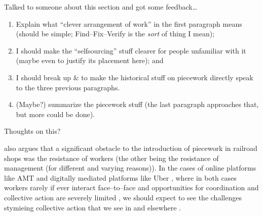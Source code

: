 \documentclass[trackingWork]{subfiles}
\begin{document}
{      Talked to someone about this section and got some feedback\dots
      \begin{enumerate}
        \item Explain what ``clever arrangement of work'' in the first paragraph means
              (should be simple; Find--Fix--Verify is the \textit{sort} of thing I mean);
        \item I should make the ``selfsourcing'' stuff clearer for people unfamiliar with it
              (maybe even to justify its placement here); and
        \item I should break up \citeauthor{10.2307/23702539} \& \citeauthor{Brown01041990}
              to make the historical stuff on piecework
              directly speak to the three previous paragraphs.
        \item (Maybe?) summarize the piecework stuff
              (the last paragraph approaches that, but more could be done).
      \end{enumerate}
      Thoughts on this?

  \citeauthor{10.2307/23702539} also argues that
  a significant obstacle to the introduction of piecework in railroad shops was
  the resistance of workers
  (the other being the resistance of management (for different and varying reasons)).
  In the cases of online platforms like AMT and digitally mediated platforms like Uber%
,   where in both cases workers rarely
  if ever
  interact face--to--face and
  opportunities for coordination and collective action are severely limited%
,   we should expect to see
  the challenges stymieing collective action
  that we see in \citeauthor{dynamo} and elsewhere
  \cite{10.2307/23702539,dynamo}.
}
\end{document}
